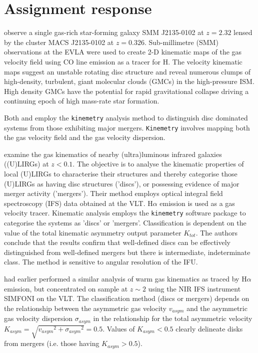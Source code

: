 \documentclass[ceqn,usenatbib,onecolumn]{mnras}
\begin{document}
\section{Assignment response}
\citet{2011ApJ...742...11S}  observe a single gas-rich star-forming galaxy SMM J2135-0102 at $z=2.32$ lensed by the cluster MACS J2135-0102 at $z=0.326$. Sub-millimetre (SMM) observations at the EVLA were used to create 2-D kinematic maps of the gas velocity field using CO line emission as a tracer for H. The  velocity kinematic maps suggest an unstable rotating disc structure and reveal numerous clumps of high-density, turbulent, giant molecular clouds (GMCs) in the high-pressure ISM. High density GMCs have the potential for rapid gravitational collapse driving a continuing epoch of high mass-rate star formation.
\par
Both \citet{2008ApJ...682..231S} and \citet{2016A&A...591A..85B} employ the \texttt{kinemetry} analysis method \citep{2006MNRAS.366..787K} to distinguish disc dominated systems from those exhibiting major mergers. \texttt{Kinemetry} involves mapping both the gas velocity field and the gas velocity dispersion.
\par
\citet{2016A&A...591A..85B} examine the gas kinematics of nearby (ultra)luminous infrared galaxies ((U)LIRGs) at $z<0.1$. The objective is to analyse the kinematic properties of local (U)LIRGs to characterise their structures and thereby categorise those (U)LIRGs as having disc structures ('discs'), or possessing evidence of major merger activity ('mergers'). Their method employs optical integral field spectroscopy (IFS) data obtained at the VLT. H$\alpha$ emission is used as a gas velocity tracer. Kinematic analysis employs the \texttt{kinemetry} software package to categorise the systems as 'discs' or 'mergers'. Classification is dependent on the value of the total kinematic asymmetry output parameter $K_{tot}$. The authors conclude that the results confirm that well-defined discs can be effectively distinguished from well-defined mergers but there is intermediate, indeterminate class. The method is sensitive to angular resolution of the IFU.
\par
\citet{2008ApJ...682..231S} had earlier performed a similar analysis of warm gas kinematics as traced by H$\alpha$ emission, but concentrated on sample at $z\sim2$ using the NIR IFS instrument SIMFONI on the VLT. The classification method (discs or mergers) depends on the relationship between the asymmetric gas velocity $v_{asym}$ and the asymmetric gas velocity dispersion $\sigma_{asym}$ in the relationship for the total asymmetric velocity $K_{asym}={\sqrt{{v_{asym}}^2+{\sigma_{asym}}^2}}=0.5$. Values of $K_{asym}<0.5$ clearly delineate disks from mergers (i.e. those having $K_{asym}>0.5$).


 
\end{document}

